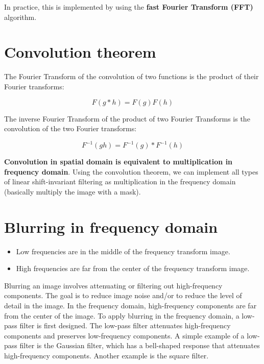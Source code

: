 \documentclass{article}
\begin{document}
In practice, this is implemented by using the \textbf{fast Fourier Transform (FFT)} algorithm.

\newpage

\section*{Convolution theorem}

The Fourier Transform of the convolution of two functions is the product of their Fourier transforms:

\begin{equation*}
    F(g * h) = F(g)F(h)
\end{equation*}

The inverse Fourier Transform of the product of two Fourier Transforms is the convolution of the two Fourier transforms:

\begin{equation*}
    F^{-1}(gh) = F^{-1}(g) * F^{-1}(h)
\end{equation*}

\textbf{Convolution in spatial domain is equivalent to multiplication in frequency domain}. Using the convolution theorem, we can implement all types of linear shift-invariant filtering as multiplication in the frequency domain (basically multiply the image with a mask).

\section*{Blurring in frequency domain}

\begin{itemize}
    \item Low frequencies are in the middle of the frequency transform image.
    \item High frequencies are far from the center of the frequency transform image. 
\end{itemize}

Blurring an image involves attenuating or filtering out high-frequency components. The goal is to reduce image noise and/or to reduce the level of detail in the image. In the frequency domain, high-frequency components are far from the center of the image. To apply blurring in the frequency domain, a low-pass filter is first designed. The low-pass filter attenuates high-frequency components and preserves low-frequency components. A simple example of a low-pass filter is the Gaussian filter, which has a bell-shaped response that attenuates high-frequency components. Another example is the square filter.
\end{document}

